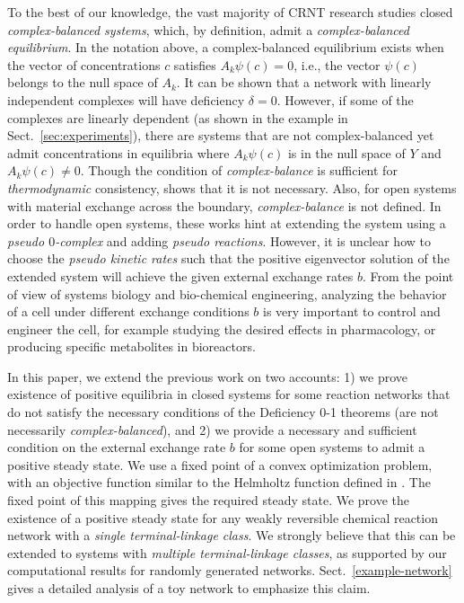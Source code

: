 \documentclass[smallextended]{svjour3}       %
\newcommand*{\0}{\mathbf{0}}
\newcommand*{\1}{\mathbf{1}}
\begin{document}
To the best of our knowledge, the vast majority of CRNT research studies closed
\textit{complex-balanced systems}, which, by definition, admit a
\textit{complex-balanced equilibrium}. In the notation above, a
complex-balanced equilibrium exists when the vector of concentrations $c$ satisfies
$A_k\psi(c)=0$, i.e., the vector $\psi(c)$ belongs to the null space of $A_k$.
It can be shown that a network with linearly independent complexes will have
deficiency $\delta = 0$. However, if some of the complexes are linearly
dependent (as shown in the example in Sect.~\ref{sec:experiments}),
there are systems that are
not complex-balanced yet admit concentrations in equilibria where $A_k \psi(c)$
is in the null space of $Y$ and $A_k\psi(c) \neq 0$.  Though the condition of
\emph{complex-balance} is sufficient for \emph{thermodynamic} consistency,
\cite{GMAK} shows that it is not necessary. Also, for open systems with
material exchange across the boundary, \emph{complex-balance} is not defined.
In order to handle open systems, these works hint at extending the system using
a \emph{pseudo $0$-complex} and adding \emph{pseudo reactions}.  However, it is
unclear how to choose the \emph{pseudo kinetic rates} such that the positive
eigenvector solution of the extended system will achieve the given external
exchange rates $b$. From the point of view of systems biology and bio-chemical
engineering, analyzing the behavior of a cell under different exchange
conditions $b$ is very important to control and engineer the cell, for example
studying the desired effects in pharmacology, or producing specific metabolites
in bioreactors.

\vspace{0.2in}
In this paper, we extend the previous work on two accounts: 1) we prove
existence of positive equilibria in closed systems for some reaction networks
that do not satisfy the necessary conditions of the Deficiency 0-1 theorems
(are not necessarily \emph{complex-balanced}), and 2) we provide a necessary
and sufficient condition on the external exchange rate $b$ for some open
systems to admit a positive steady state. We use a fixed point of a convex
optimization problem, with an objective function similar to the Helmholtz
function defined in \cite{GMAK}. The fixed point of this mapping gives the
required steady state. We prove the existence of a positive steady state for
any weakly reversible chemical reaction network with a \emph{single
terminal-linkage class}. We strongly believe that this can be extended to
systems with \emph{multiple terminal-linkage classes}, as supported by our
computational results for randomly generated networks. Sect.~\ref{example-network}
gives a detailed analysis of a toy network to emphasize this claim.
\end{document}
